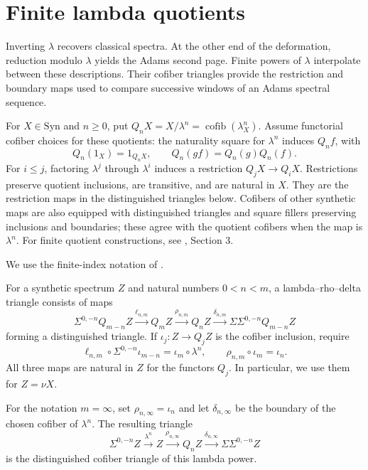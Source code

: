 \section{Finite lambda quotients}

Inverting $\lambda$ recovers classical spectra. At the other end of the
deformation, reduction modulo $\lambda$ yields the Adams second page.
Finite powers of $\lambda$ interpolate between these descriptions. Their
cofiber triangles provide the restriction and boundary maps used to
compare successive windows of an Adams spectral sequence.



\begin{definition}
\label{sem:AdamsSynthetic:lambda-quotients}
\label{notation:AdamsSynthetic:quotient-boundary-maps}
\label{not:deltaandrho}
For $X\in\mathrm{Syn}$ and $n\geq0$, put
$Q_nX=X/\lambda^n=\operatorname{cofib}(\lambda_X^n)$. Assume functorial cofiber choices for these quotients: the naturality
square for $\lambda^n$ induces $Q_nf$, with
\[
 Q_n(1_X)=1_{Q_nX},\qquad Q_n(gf)=Q_n(g)Q_n(f).
\]
For $i\leq j$, factoring $\lambda^j$ through $\lambda^i$ induces a
restriction $Q_jX\to Q_iX$. Restrictions preserve quotient inclusions,
are transitive, and are natural in $X$. They are the restriction maps
in the distinguished triangles below. Cofibers of other synthetic maps
are also equipped with distinguished triangles and square fillers
preserving inclusions and boundaries; these agree with the quotient
cofibers when the map is $\lambda^n$. For finite quotient constructions,
see \cite{LWX126}, Section 3.

We use the finite-index notation of \cite[Notation 4.1]{LWX126}.

For a synthetic spectrum $Z$ and natural
numbers $0<n<m$, a lambda--rho--delta triangle consists of maps
\[
\Sigma^{0,-n}Q_{m-n}Z\xrightarrow{\ell_{n,m}}Q_mZ
\xrightarrow{\rho_{n,m}}Q_nZ
\xrightarrow{\delta_{n,m}}\Sigma\Sigma^{0,-n}Q_{m-n}Z
\]
forming a distinguished triangle. If $\iota_j:Z\to Q_jZ$ is the
cofiber inclusion, require
\[
\ell_{n,m}\circ\Sigma^{0,-n}\iota_{m-n}
   =\iota_m\circ\lambda^n,
\qquad \rho_{n,m}\circ\iota_m=\iota_n.
\]
All three maps are natural in $Z$ for the functors $Q_j$. In particular,
we use them for $Z=\nu X$.

For the notation $m=\infty$, set $\rho_{n,\infty}=\iota_n$ and let
$\delta_{n,\infty}$ be the boundary of the chosen cofiber of
$\lambda^n$. The resulting triangle
\[
\Sigma^{0,-n}Z\xrightarrow{\lambda^n}Z
\xrightarrow{\rho_{n,\infty}}Q_nZ
\xrightarrow{\delta_{n,\infty}}\Sigma\Sigma^{0,-n}Z
\]
is the distinguished cofiber triangle of this lambda power.
\end{definition}


